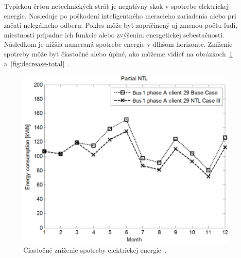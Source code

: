 \documentclass[a4paper,twoside,slovak,12pt,appendix]{article}
\begin{document}
Typickou črtou netechnických strát je negatívny skok v spotrebe elektrickej
energie. Nasleduje po poškodení inteligentného meracieho zariadenia alebo pri
začatí nelegálneho odberu. Pokles môže byť zapríčinený aj zmenou počtu ľudí,
miestností prípadne ich funkcie alebo zvýšením energetickej sebestačnosti.
Následkom je nižšia nameraná spotrebe energie v dlhšom horizonte. Zníženie
spotreby môže byť čiastočné alebo úplné, ako môžeme
vidieť na obrázkoch~\ref{fig:decrease-partial}
a~\ref{fig:decrease-total}~\cite{Spiric2015,Trevizan2015}.

\begin{figure}[htbp]

	\begin{minipage}{0.45\textwidth}
		\begin{center}
			\captionsetup{justification=centering}
			\includegraphics[scale=0.33]{decrease-partial.png}
			\caption[Čiastočné zníženie spotreby elektrickej energie.]{Čiastočné zníženie spotreby elektrickej energie~\cite{Trevizan2015}.}
			\label{fig:decrease-partial}
		\end{center}
	\end{minipage}
  \centering
  \begin{minipage}{0.45\textwidth}
    \begin{center}
      \captionsetup{justification=centering}

\end{center}
\end{minipage}
\end{figure}
\end{document}

